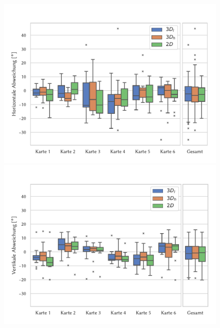 \begin{figure}
    \centering
    \includegraphics[height=0.45\textheight]{figures/analysis/horiz_error}

    \includegraphics[height=0.45\textheight]{figures/analysis/vert_error}
    \caption{}
    \label{fig:boxplot_errors}
\end{figure}

